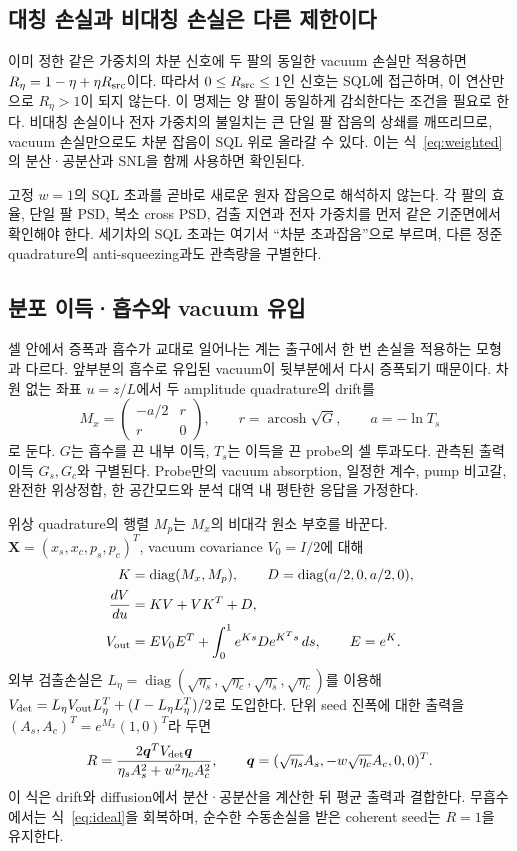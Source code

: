 \documentclass[11pt,a4paper]{article}
\begin{document}
\subsection{대칭 손실과 비대칭 손실은 다른 제한이다}
이미 정한 같은 가중치의 차분 신호에 두 팔의 동일한 vacuum 손실만
적용하면 $R_\eta=1-\eta+\eta R_{\rm src}$이다. 따라서
$0\leq R_{\rm src}\leq1$인 신호는 SQL에 접근하며, 이 연산만으로
$R_\eta>1$이 되지 않는다. 이 명제는 양 팔이 동일하게 감쇠한다는 조건을
필요로 한다. 비대칭 손실이나 전자 가중치의 불일치는 큰 단일 팔 잡음의
상쇄를 깨뜨리므로, vacuum 손실만으로도 차분 잡음이 SQL 위로 올라갈 수 있다.
이는 식~\eqref{eq:weighted}의 분산·공분산과 SNL을 함께 사용하면 확인된다.

고정 $w=1$의 SQL 초과를 곧바로 새로운 원자 잡음으로 해석하지 않는다.
각 팔의 효율, 단일 팔 PSD, 복소 cross PSD, 검출 지연과 전자 가중치를
먼저 같은 기준면에서 확인해야 한다. 세기차의 SQL 초과는 여기서
``차분 초과잡음''으로 부르며, 다른 정준 quadrature의 anti-squeezing과도
관측량을 구별한다.

\subsection{분포 이득·흡수와 vacuum 유입}
셀 안에서 증폭과 흡수가 교대로 일어나는 계는 출구에서 한 번 손실을
적용하는 모형과 다르다\cite{mc08,jasperse}. 앞부분의 흡수로 유입된 vacuum이
뒷부분에서 다시 증폭되기 때문이다. 차원 없는 좌표 $u=z/L$에서 두
amplitude quadrature의 drift를
\begin{equation}
 M_x=\begin{pmatrix}-a/2&r\\r&0\end{pmatrix},\qquad
 r=\operatorname{arcosh}\sqrt G,\qquad a=-\ln T_s
 \label{eq:mx}
\end{equation}
로 둔다. $G$는 흡수를 끈 내부 이득, $T_s$는 이득을 끈 probe의 셀
투과도다. 관측된 출력 이득 $G_s,G_c$와 구별된다.
Probe만의 vacuum absorption, 일정한 계수, pump 비고갈, 완전한 위상정합,
한 공간모드와 분석 대역 내 평탄한 응답을 가정한다.

위상 quadrature의 행렬 $M_p$는 $M_x$의 비대각 원소 부호를 바꾼다.
$\bm X=(x_s,x_c,p_s,p_c)^T$, vacuum covariance $V_0=I/2$에 대해
\begin{align}
 K&=\operatorname{diag}(M_x,M_p),\qquad D=\operatorname{diag}(a/2,0,a/2,0),\\
 \frac{dV}{du}&=KV+VK^T+D,\\
 V_{\rm out}&=EV_0E^T+\int_0^1e^{Ks}D e^{K^Ts}\,ds,\qquad E=e^K.
 \label{eq:cov}
\end{align}
외부 검출손실은 $L_\eta=\operatorname{diag}
(\sqrt{\eta_s},\sqrt{\eta_c},\sqrt{\eta_s},\sqrt{\eta_c})$를 이용해
$V_{\rm det}=L_\eta V_{\rm out}L_\eta^T+(I-L_\eta L_\eta^T)/2$로 도입한다.
단위 seed 진폭에 대한 출력을 $(A_s,A_c)^T=e^{M_x}(1,0)^T$라 두면
\begin{equation}
 R=\frac{2\bm q^TV_{\rm det}\bm q}{\eta_sA_s^2+w^2\eta_cA_c^2},\qquad
 \bm q=(\sqrt{\eta_s}A_s,-w\sqrt{\eta_c}A_c,0,0)^T.
 \label{eq:covids}
\end{equation}
이 식은 drift와 diffusion에서 분산·공분산을 계산한 뒤 평균 출력과 결합한다.
무흡수에서는 식~\eqref{eq:ideal}을 회복하며, 순수한 수동손실을 받은
coherent seed는 $R=1$을 유지한다.
\end{document}
